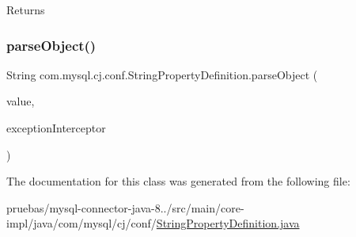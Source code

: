 \begin{DoxyReturn}{Returns}

\end{DoxyReturn}
\mbox{\label{classcom_1_1mysql_1_1cj_1_1conf_1_1_string_property_definition_aa532cc6f4673a7c64d941e74c2c23e0e}} 
\subsubsection{\texorpdfstring{parse\+Object()}{parseObject()}}
{\footnotesize\ttfamily String com.\+mysql.\+cj.\+conf.\+String\+Property\+Definition.\+parse\+Object (\begin{DoxyParamCaption}\item[{String}]{value,  }\item[{\mbox{\hyperlink{interfacecom_1_1mysql_1_1cj_1_1exceptions_1_1_exception_interceptor}{Exception\+Interceptor}}}]{exception\+Interceptor }\end{DoxyParamCaption})}



The documentation for this class was generated from the following file\+:\begin{DoxyCompactItemize}
\item 
pruebas/mysql-\/connector-\/java-\/8../src/main/core-\/impl/java/com/mysql/cj/conf/\mbox{\hyperlink{_string_property_definition_8java}{String\+Property\+Definition.\+java}}\end{DoxyCompactItemize}
